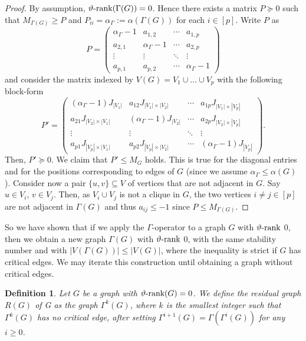 \documentclass[11pt]{article}
\newtheorem{definition}[theorem]{Definition}
\numberwithin{equation}{section}
\newcommand{\rrank}{\vartheta\text{\rm -rank}}
\begin{document}
\begin{proof}
By assumption, $\rrank(\Gamma(G))=0$. Hence  there exists a matrix $P\succeq 0$ such that $M_{\Gamma(G)}\ge  P$ and $P_{ii}=\alpha_\Gamma:=\alpha(\Gamma(G))$ for each $i\in [p]$. Write    $P$ as
$$
P=\begin{pmatrix}
\alpha_\Gamma -1 & a_{1,2} & \cdots & a_{1,p} \\
a_{2,1}& \alpha_\Gamma -1& \cdots & a_{2,p}\\
\vdots  & \vdots  & \ddots & \vdots  \\
a_{p,1}& a_{p,2} & \cdots & \alpha_\Gamma-1 
\end{pmatrix}
$$
and consider the matrix indexed by $V(G)=V_1\cup\ldots\cup V_p$ with the following block-form
        \begin{equation*}
    P'=
\begin{pmatrix}
(\alpha_\Gamma -1)J_{|V_1|} & a_{12}J_{|V_1|\times |V_2|} & \cdots & a_{1p}J_{|V_1|\times|V_p| } \\
a_{21}J_{|V_2|\times |V_1|} & (\alpha_\Gamma -1)J_{|V_2|}& \cdots & a_{2p}J_{|V_2|\times |V_p|} \\
\vdots  & \vdots  & \ddots & \vdots  \\
a_{p1}J_{|V_p|\times |V_1|} & a_{p2}J_{|V_p|\times |V_2|} & \cdots & (\alpha_\Gamma-1)J_{|V_p|} 
\end{pmatrix}.
\end{equation*}
Then, $P'\succeq 0$. We claim that $P'\le M_G$ holds.
This is true for the diagonal entries and  for the positions corresponding to edges of $G$ (since we assume $\alpha_\Gamma\le \alpha(G)$). Consider now a pair $\{u,v\}\subseteq V$ of vertices that are not adjacent in $G$. Say $u\in V_i$, $v\in V_j$. Then, as 
$V_i\cup V_j$ is not a clique in $G$, the two vertices  $i\ne j\in [p]$ are not adjacent in $\Gamma(G)$ and thus $a_{ij}\le -1$ since $P\le M_{\Gamma(G)}$.
\end{proof}



So we have shown that if we apply the $\Gamma$-operator to a graph $G$ with $\rrank$ 0,  then we obtain a new graph $\Gamma(G)$ with $\rrank$ 0, with the same stability number  and  with $|V(\Gamma(G))|\le |V(G)|$, where the inequality is strict if $G$ has  critical edges.  We may iterate this construction  until obtaining a graph without critical edges.

\begin{definition}\label{def-residual}
Let $G$ be a graph with  $\rrank (G)=0$. We define the {\em residual graph} $R(G)$ of G as the graph $\Gamma^{k}(G)$, where $k$ is the smallest integer such that $\Gamma^{k}(G)$ has no critical edge, after setting $\Gamma^{i+1}(G)=\Gamma(\Gamma^{i}(G))$ for any  $i\ge 0$.
\end{definition}
\end{document}
